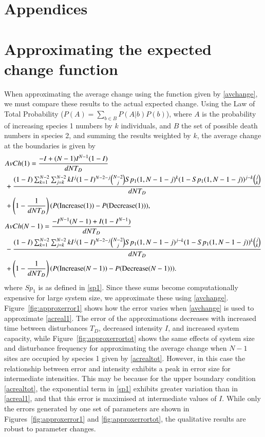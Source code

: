 \section*{Appendices}

\bappendix
\section{Approximating the expected change function}
\label{app2a}
 When approximating the average change using the function given by \eqref{avchange}, we must compare these results to the actual expected change. Using the Law of Total Probability ($P(A)=\sum_{b \in B} P(A|b)P(b)$), where $A$ is the probability of increasing species 1 numbers by $k$ individuals, and $B$ the set of possible death numbers in species 2, and summing the results weighted by $k$, the average change at the boundaries is given by
\begin{align}
\label{acreal1}&AvCh(1)=\frac{-I+(N-1)I^{N-1}(1-I)}{dNT_D}\\
&+\frac{(1-I)\sum_{k=1}^{N-2}\sum_{j=k}^{N-2}k I^j(1-I)^{N-2-j}{N-2\choose j} Sp_1(1,N-1-j)^k(1-Sp_1(1,N-1-j))^{j-k} {j \choose k}}{dNT_D} \notag \\
 &+ \left(1-\frac{1}{dNT_D}\right)(P(\text{Increase}(1))-P(\text{Decrease}(1))), \notag \\
 \label{acrealtot}&AvCh(N-1)= \frac{-I^{N-1}(N-1) +I(1-I^{N-1})}{dNT_D} \\
 &-\frac{(1-I)\sum_{k=1}^{N-2}\sum_{j=k}^{N-2}k I^j(1-I)^{N-2-j}{N-2\choose j} Sp_1(1,N-1-j)^{j-k}(1-Sp_1(1,N-1-j))^{k} {j \choose k}}{dNT_D} \notag \\
 &+ \left(1-\frac{1}{dNT_D}\right)(P(\text{Increase}(N-1))-P(\text{Decrease}(N-1))). \notag
  \end{align}
where $Sp_1$ is as defined in \eqref{sp1}. Since these sums become computationally expensive for large system size, we approximate these using \eqref{avchange}. Figure~\ref{fig:approxerror1} shows how the error varies when \eqref{avchange} is used to approximate \eqref{acreal1}. The error of the approximations decreases with increased time between disturbances $T_D$, decreased intensity $I$, and increased system capacity, while Figure~\ref{fig:approxerrortot} shows the same effects of system size and disturbance frequency for approximating the average change when $N-1$ sites are occupied by species 1 given by \eqref{acrealtot}. However, in this case the relationship between error and intensity exhibits a peak in error size for intermediate intensities. This may be because for the upper boundary condition \eqref{acrealtot}, the exponential term in \eqref{sp1} exhibits greater variation than in \eqref{acreal1}, and that this error is maximised at intermediate values of $I$. While only the errors generated by one set of parameters are shown in Figures~\ref{fig:approxerror1} and \ref{fig:approxerrortot}, the qualitative results are robust to parameter changes.
